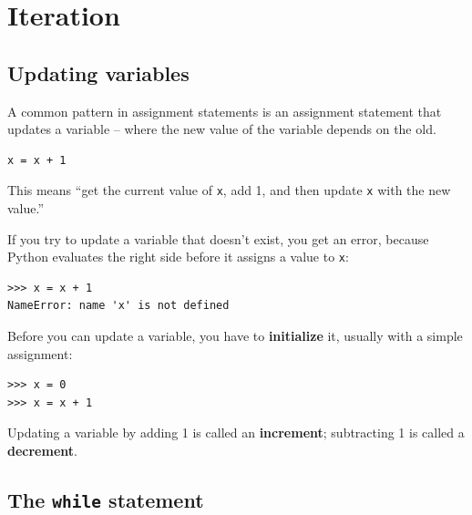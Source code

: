 
\chapter{Iteration}

\section{Updating variables}
\label{update}


A common pattern in assignment statements is an assignment statement
that updates a variable -- 
where the new value of the variable depends on the old.

\beforeverb
\begin{verbatim}
x = x + 1
\end{verbatim}
\afterverb
%
This means ``get the current value of {\tt x}, add 1, and then
update {\tt x} with the new value.''

If you try to update a variable that doesn't exist, you get an
error, because Python evaluates the right side before it assigns
a value to {\tt x}:

\beforeverb
\begin{verbatim}
>>> x = x + 1
NameError: name 'x' is not defined
\end{verbatim}
\afterverb
%
Before you can update a variable, you have to {\bf initialize}
it, usually with a simple assignment:


\beforeverb
\begin{verbatim}
>>> x = 0
>>> x = x + 1
\end{verbatim}
\afterverb
%
Updating a variable by adding 1 is called an {\bf increment};
subtracting 1 is called a {\bf decrement}.


\section{The {\tt while} statement}


